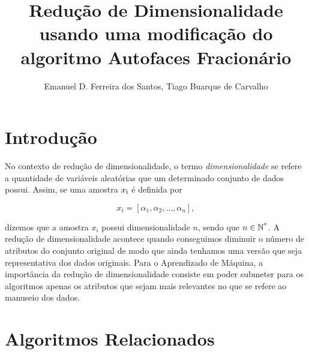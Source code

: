 \documentclass[12pt]{article}
\begin{document}
\title{Redução de Dimensionalidade usando uma modificação do algoritmo Autofaces Fracionário}
\author{Emanuel D. Ferreira dos Santos, Tiago Buarque de Carvalho}
\maketitle


\section{Introdução}

No contexto de redução de dimensionalidade, o termo \textit{dimensionalidade} se refere a quantidade de variáveis aleatórias que um determinado conjunto de dados possui. Assim, se uma amostra $x\textsubscript{i}$ é definida por

$$
x_i = [\alpha_1 ,\alpha_2 ,\ldots,\alpha_n],
$$

dizemos que a amostra $x_i$ possui dimensionalidade $n$, sendo que $n \in \mathbb{N}\textsuperscript{*} $.\linebreak
\indent A redução de dimensionalidade acontece quando conseguimos diminuir o número de atributos do conjunto original de modo que ainda tenhamos uma versão que seja representativa dos dados originais.\linebreak
\indent Para o Aprendizado de Máquina, a importância da redução de dimensionalidade consiste em poder submeter para os algoritmos apenas os atributos que sejam mais relevantes no que se refere ao manuseio dos dados.

\section{Algoritmos Relacionados}
\end{document}

